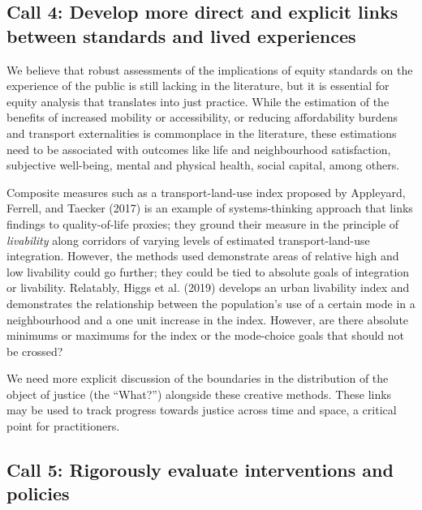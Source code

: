 \documentclass[12pt, oneside]{report}
\begin{document}
\hypertarget{call-4-develop-more-direct-and-explicit-links-between-standards-and-lived-experiences}{%
\subsection{Call 4: Develop more direct and explicit links between
standards and lived
experiences}\label{call-4-develop-more-direct-and-explicit-links-between-standards-and-lived-experiences}}

We believe that robust assessments of the implications of equity
standards on the experience of the public is still lacking in the
literature, but it is essential for equity analysis that translates into
just practice. While the estimation of the benefits of increased
mobility or accessibility, or reducing affordability burdens and
transport externalities is commonplace in the literature, these
estimations need to be associated with outcomes like life and
neighbourhood satisfaction, subjective well-being, mental and physical
health, social capital, among others.

Composite measures such as a transport-land-use index proposed by
Appleyard, Ferrell, and Taecker (2017) is an example of systems-thinking
approach that links findings to quality-of-life proxies; they ground
their measure in the principle of \emph{livability} along corridors of
varying levels of estimated transport-land-use integration. However, the
methods used demonstrate areas of relative high and low livability could
go further; they could be tied to absolute goals of integration or
livability. Relatably, Higgs et al. (2019) develops an urban livability
index and demonstrates the relationship between the population's use of
a certain mode in a neighbourhood and a one unit increase in the index.
However, are there absolute minimums or maximums for the index or the
mode-choice goals that should not be crossed?

We need more explicit discussion of the boundaries in the distribution
of the object of justice (the ``What?'') alongside these creative
methods. These links may be used to track progress towards justice
across time and space, a critical point for practitioners.

\hypertarget{call-5-rigorously-evaluate-interventions-and-policies}{%
\subsection{Call 5: Rigorously evaluate interventions and
policies}\label{call-5-rigorously-evaluate-interventions-and-policies}}
\end{document}
